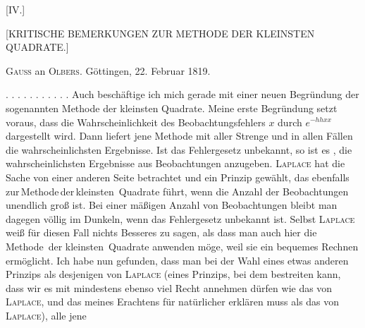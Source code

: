 \clearpage
{}
\begin{center}
[IV.]

{\large [KRITISCHE BEMERKUNGEN ZUR METHODE DER KLEINSTEN QUADRATE.]}
\end{center}



\begin{center}
\textsc{Gauss} an \textsc{Olbers}. Göttingen, 22. Februar 1819.
\end{center}

\noindent . . . . . . . . . . . Auch beschäftige ich mich gerade mit einer neuen Begründung der sogenannten Methode der kleinsten Quadrate. Meine erste Begründung setzt voraus, dass die Wahrscheinlichkeit des Beobachtungsfehlers $x$ durch $e^{-hhxx}$ dargestellt wird. Dann liefert jene Methode mit aller Strenge und in allen Fällen die wahrscheinlichsten Ergebnisse. Ist das Fehlergesetz unbekannt, so ist es , die wahrscheinlichsten Ergebnisse aus  Beobachtungen anzugeben. \textsc{Laplace} hat die Sache von einer anderen Seite betrachtet und ein Prinzip gewählt, das ebenfalls zur\,Methode\,der\,kleinsten\ Quadrate führt, wenn die Anzahl der Beobachtungen unendlich groß ist. Bei einer mäßigen Anzahl von Beobachtungen bleibt man dagegen völlig im Dunkeln, wenn das Fehlergesetz unbekannt ist. Selbst \textsc{Laplace} weiß für diesen Fall nichts Besseres zu sagen, als dass man auch hier die Methode\ der kleinsten\ Quadrate anwenden möge, weil sie ein bequemes Rechnen ermöglicht. Ich habe nun gefunden, dass man bei der Wahl eines etwas anderen Prinzips als desjenigen von \textsc{Laplace} (eines Prinzips, bei dem  bestreiten kann, dass wir es mit mindestens ebenso viel Recht annehmen dürfen wie das von \textsc{Laplace}, und das meines Erachtens  für natürlicher erklären muss als das von \textsc{Laplace}), alle jene\space%
